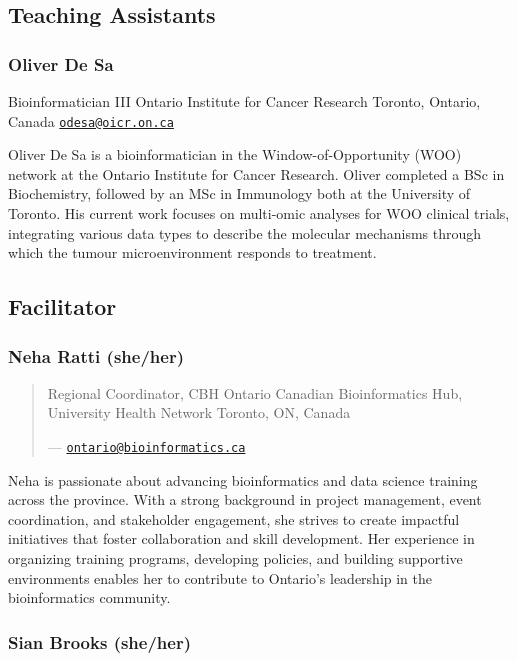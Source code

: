 \documentclass[
]{book}
\begin{document}
\subsection{Teaching Assistants}\label{teaching-assistants}

\subsubsection{Oliver De Sa}\label{oliver-de-sa}

Bioinformatician III
Ontario Institute for Cancer Research
Toronto, Ontario, Canada
\href{mailto:odesa@oicr.on.ca}{\nolinkurl{odesa@oicr.on.ca}}

Oliver De Sa is a bioinformatician in the Window-of-Opportunity (WOO) network at the Ontario Institute for Cancer Research. Oliver completed a BSc in Biochemistry, followed by an MSc in Immunology both at the University of Toronto. His current work focuses on multi-omic analyses for WOO clinical trials, integrating various data types to describe the molecular mechanisms through which the tumour microenvironment responds to treatment.

\subsection{Facilitator}\label{facilitator}

\subsubsection{Neha Ratti (she/her)}\label{neha-ratti-sheher}

\begin{quote}
Regional Coordinator, CBH Ontario
Canadian Bioinformatics Hub, University Health Network
Toronto, ON, Canada

--- \href{mailto:ontario@bioinformatics.ca}{\nolinkurl{ontario@bioinformatics.ca}}
\end{quote}

Neha is passionate about advancing bioinformatics and data science training across the province. With a strong background in project management, event coordination, and stakeholder engagement, she strives to create impactful initiatives that foster collaboration and skill development. Her experience in organizing training programs, developing policies, and building supportive environments enables her to contribute to Ontario's leadership in the bioinformatics community.

\subsubsection{Sian Brooks (she/her)}\label{sian-brooks-sheher}
\end{document}

